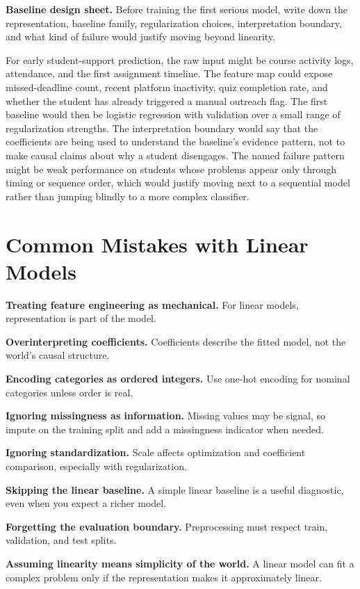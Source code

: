 \begin{thinkingtool}
\textbf{Baseline design sheet.} Before training the first serious model, write down the representation, baseline family, regularization choices, interpretation boundary, and what kind of failure would justify moving beyond linearity.
\end{thinkingtool}

\begin{example}
For early student-support prediction, the raw input might be course activity logs, attendance, and the first assignment timeline. The feature map could expose missed-deadline count, recent platform inactivity, quiz completion rate, and whether the student has already triggered a manual outreach flag. The first baseline would then be logistic regression with validation over a small range of regularization strengths. The interpretation boundary would say that the coefficients are being used to understand the baseline's evidence pattern, not to make causal claims about why a student disengages. The named failure pattern might be weak performance on students whose problems appear only through timing or sequence order, which would justify moving next to a sequential model rather than jumping blindly to a more complex classifier.
\end{example}

\section{Common Mistakes with Linear Models}

\begin{mistakebox}
\item \textbf{Treating feature engineering as mechanical.} For linear models, representation is part of the model.
\item \textbf{Overinterpreting coefficients.} Coefficients describe the fitted model, not the world's causal structure.
\item \textbf{Encoding categories as ordered integers.} Use one-hot encoding for nominal categories unless order is real.
\item \textbf{Ignoring missingness as information.} Missing values may be signal, so impute on the training split and add a missingness indicator when needed.
\item \textbf{Ignoring standardization.} Scale affects optimization and coefficient comparison, especially with regularization.
\item \textbf{Skipping the linear baseline.} A simple linear baseline is a useful diagnostic, even when you expect a richer model.
\item \textbf{Forgetting the evaluation boundary.} Preprocessing must respect train, validation, and test splits.
\item \textbf{Assuming linearity means simplicity of the world.} A linear model can fit a complex problem only if the representation makes it approximately linear.
\end{mistakebox}

